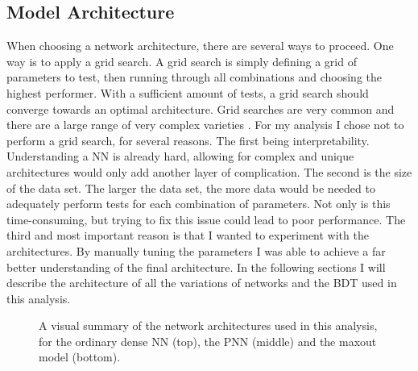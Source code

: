 \subsection{Model Architecture}\label{subsec:arch}
When choosing a network architecture, there are several ways to proceed. One way is to apply a grid search.
A grid search is simply defining a grid of parameters to test, then running through all combinations and 
choosing the highest performer. With a sufficient amount of tests, a grid search should converge towards 
an optimal architecture. Grid searches are very common and there are a large range of very complex varieties \cite{GS}.
For my analysis I chose not to perform a grid search, for several reasons. The first being interpretability.
Understanding a \ac{NN} is already hard, allowing for complex and unique architectures would only add another layer
of complication. The second is the size of the data set. The larger the data set, the more data 
would be needed to adequately perform tests for each combination of parameters. Not only is this time-consuming,
but trying to fix this issue could lead to poor performance. The third and most important reason is that 
I wanted to experiment with the architectures. By manually tuning the parameters I was able to achieve a far 
better understanding of the final architecture. In the following sections I will describe the architecture of all the 
variations of networks and the \ac{BDT} used in this analysis.
\begin{figure}
    \caption{A visual summary of the network architectures used in this analysis, for the ordinary dense \acs{NN} (top), the \acs{PNN} (middle)
    and the maxout model (bottom).}
    \label{fig:arch}
\end{figure}
